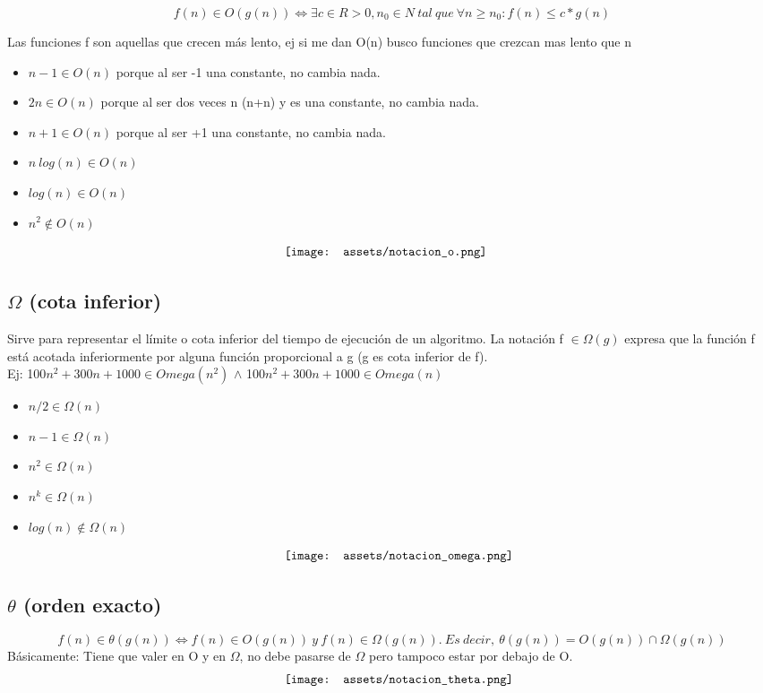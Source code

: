\documentclass[10pt,a4paper]{article}
\begin{document}
\[ f (n) \in O(g(n)) \iff \exists c \in R>0, n_{0} \in N \ tal \ que \
\forall n \ge n_{0} : f (n) \le c \ast g(n) \]

Las funciones f son aquellas que crecen más lento, ej si me dan O(n) busco funciones que crezcan mas lento que n
\begin{itemize}
    \item \(n-1 \in O(n) \) porque al ser -1 una constante, no cambia nada.
    \item \(2n \in O(n)\) porque al ser dos veces n (n+n) y es una constante, no cambia nada.
    \item \(n+1 \in O(n)\)  porque al ser +1 una constante, no cambia nada.
    \item \(n\ log(n) \in O(n)\)
    \item \(log(n) \in O(n)\)
    \item \(n^{2} \notin O(n)\)
\end{itemize}
\[\begin{minipage}[b]{0.5\textwidth}
    \texttt{[image: assets/notacion\_o.png]}
\end{minipage}\]
\subsection*{\(\Omega\) (cota inferior)}
Sirve para representar el límite o cota inferior del tiempo de ejecución de un algoritmo.
La notación f \(\in \Omega(g)\) expresa que la función f está acotada inferiormente por alguna función proporcional a g (g es cota inferior de f). \\
Ej: 100\(n^{2} + 300n + 1000 \in Omega(n^{2})\) \(\land\) 100\(n^{2} + 300n + 1000 \in Omega(n)\)
\begin{itemize}
    \item \(n/2 \in \Omega(n)\)
    \item \(n-1 \in \Omega(n)\)
    \item \(n^{2} \in \Omega(n)\)
    \item \(n^{k} \in \Omega(n)\) 
    \item \(log(n) \notin \Omega(n)\) 
\end{itemize}
\[\begin{minipage}[b]{0.5\textwidth}
    \texttt{[image: assets/notacion\_omega.png]}
\end{minipage}\]
\subsection*{\(\theta\) (orden exacto)}
\[f (n) \in \theta(g(n)) \iff f (n) \in O(g(n)) \ y \ f (n) \in \Omega(g(n)).\ Es \ decir, \ \theta(g(n)) = O(g(n)) \cap \Omega(g(n))\]
Básicamente: Tiene que valer en O y en \(\Omega\), no debe pasarse de \(\Omega\) pero tampoco estar por debajo de O.
\[\begin{minipage}[b]{0.5\textwidth}
    \texttt{[image: assets/notacion\_theta.png]}
\end{minipage}\]
\end{document}

